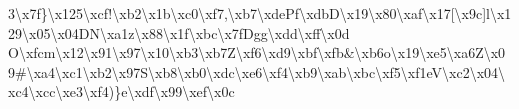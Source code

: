 3\textbackslash{}x7f\}\textbackslash{}x125\textbackslash{}xcf!\textbackslash{}xb2\textbackslash{}x1b\textbackslash{}xc0\textbackslash{}xf7,\textbackslash{}xb7\textbackslash{}xde\+Pf\textbackslash{}xdb\+D\textbackslash{}x19\textbackslash{}x80\textbackslash{}xaf\textbackslash{}x17\mbox{[}\textbackslash{}x9c\mbox{]}l\textbackslash{}x129\textbackslash{}x05\textbackslash{}x04\+D\+N\textbackslash{}xa1z\textbackslash{}x88\textbackslash{}x1f\textbackslash{}xbc\textbackslash{}x7f\+Dgg\textbackslash{}xdd\textbackslash{}xff\textbackslash{}x0d O\textbackslash{}xfcm\textbackslash{}x12\textbackslash{}x91\textbackslash{}x97\textbackslash{}x10\textbackslash{}xb3\textbackslash{}xb7\+Z\textbackslash{}xf6\textbackslash{}xd9\textbackslash{}xbf\textbackslash{}xfb\&\textbackslash{}xb6o\textbackslash{}x19\textbackslash{}xe5\textbackslash{}xa6\+Z\textbackslash{}x09\#\textbackslash{}xa4\textbackslash{}xc1\textbackslash{}xb2\textbackslash{}x97\+S\textbackslash{}xb8\textbackslash{}xb0\textbackslash{}xdc\textbackslash{}xe6\textbackslash{}xf4\textbackslash{}xb9\textbackslash{}xab\textbackslash{}xbc\textbackslash{}xf5\textbackslash{}xf1e\+V\textbackslash{}xc2\textbackslash{}x04\textbackslash{}xc4\textbackslash{}xcc\textbackslash{}xe3\textbackslash{}xf4)\}e\textbackslash{}xdf\textbackslash{}x99\textbackslash{}xef\textbackslash{}x0c 